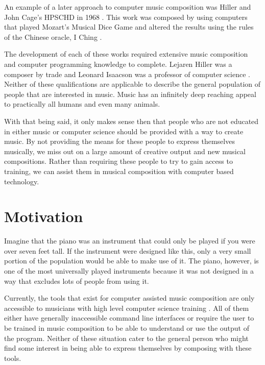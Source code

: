 An example of a later approach to computer music composition was Hiller and John Cage's HPSCHD in 1968 \cite{Brit_2018}.  This work was composed by using computers that played Mozart's Musical Dice Game and altered the results using the rules of the Chinese oracle, I Ching \cite{Brit_2018}.

\vspace{\baselineskip}

The development of each of these works required extensive music composition and computer programming knowledge to complete.  Lejaren Hiller was a composer by trade and Leonard Isaacson was a professor of computer science \cite{Brit_2018}.  Neither of these qualifications are applicable to describe the general population of people that are interested in music.  Music has an infinitely deep reaching appeal to practically all humans and even many animals.

\vspace{\baselineskip}

With that being said, it only makes sense then that people who are not educated in either music or computer science should be provided with a way to create music.  By not providing the means for these people to express themselves musically, we miss out on a large amount of creative output and new musical compositions.  Rather than requiring these people to try to gain access to training, we can assist them in musical composition with computer based technology.

\section{Motivation} 
\label{sec:motivation}

Imagine that the piano was an instrument that could only be played if you were over seven feet tall.  If the instrument were designed like this, only a very small portion of the population would be able to make use of it.  The piano, however, is one of the most universally played instruments because it was not designed in a way that excludes lots of people from using it.

\vspace{\baselineskip}

Currently, the tools that exist for computer assisted music composition are only accessible to musicians with high level computer science training \cite{Teymuri_2019}.  All of them either have generally inaccessible command line interfaces or require the user to be trained in music composition to be able to understand or use the output of the program.  Neither of these situation cater to the general person who might find some interest in being able to express themselves by composing with these tools.

